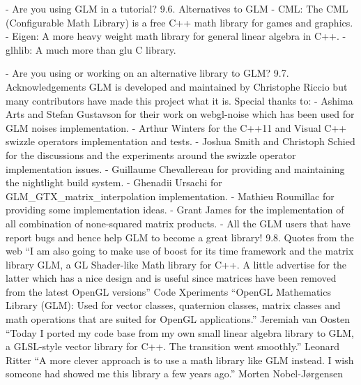 \documentclass{scrartcl}
\numberwithin{figure}{subsection}
\begin{document}
- Are you using GLM in a tutorial?
9.6. Alternatives to GLM
- CML: The CML (Configurable Math Library) is a free C++ math library for games and graphics.
- Eigen: A more heavy weight math library for general linear algebra in C++.
- glhlib: A much more than glu C library.

- Are you using or working on an alternative library to GLM?
9.7. Acknowledgements
GLM is developed and maintained by Christophe Riccio but many contributors have made this project what it is.
Special thanks to:
- Ashima Arts and Stefan Gustavson for their work on webgl-noise which has been used for GLM noises implementation.
- Arthur Winters for the C++11 and Visual C++ swizzle operators implementation and tests.
- Joshua Smith and Christoph Schied for the discussions and the experiments around the swizzle operator implementation issues.
- Guillaume Chevallereau for providing and maintaining the nightlight build system.
- Ghenadii Ursachi for GLM_GTX_matrix_interpolation implementation.
- Mathieu Roumillac for providing some implementation ideas.
- Grant James for the implementation of all combination of none-squared matrix products.
- All the GLM users that have report bugs and hence help GLM to become a great library!
9.8. Quotes from the web
“I am also going to make use of boost for its time framework and the matrix library GLM, a GL Shader-like Math library for C++. A little advertise for the latter which has a nice design and is useful since matrices have been removed from the latest OpenGL versions”
Code Xperiments
“OpenGL Mathematics Library (GLM): Used for vector classes, quaternion classes, matrix classes and math operations that are suited for OpenGL applications.”
Jeremiah van Oosten
“Today I ported my code base from my own small linear algebra library to GLM, a GLSL-style vector library for C++. The transition went smoothly.”
Leonard Ritter
“A more clever approach is to use a math library like GLM instead. I wish someone had showed me this library a few years ago.”
Morten Nobel-Jørgensen

\fi
\end{document}

